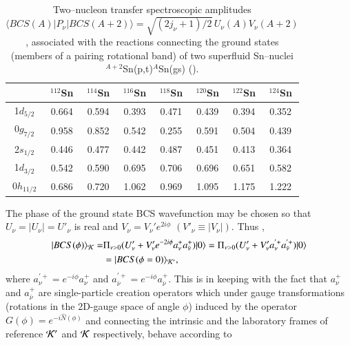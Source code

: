 \begin{table}[h!]
{\begin{tabular}{|c|c|c|c|c|c|c|c|}
\cline{1-8} 
& $^{112}$Sn & $^{114}$Sn&  $^{116}$Sn & $^{118}$Sn&  $^{120}$Sn &  $^{122}$Sn &  $^{124}$Sn          \\
\hline
1$d_{5/2}$            & 0.664      &  0.594   & 0.393    & 0.471      & 0.439     &  0.394    &  0.352                  \\
\hline 
0$g_{7/2}$            &  0.958     &  0.852  &  0.542     &  0.255   &  0.591      &  0.504  &   0.439                 \\
\hline 
2$s_{1/2}$            &  0.446    & 0.477    &  0.442    &  0.487     &  0.451   &  0.413     & 0.364                   \\
\hline 
1$d_{3/2}$            &  0.542    & 0.590   &  0.695    &  0.706     &  0.696   & 0.651   &   0.582                 \\
\hline 
0$h_{11/2}$            & 0.686     & 0.720    &  1.062     &  0.969     &  1.095   &  1.175    &   1.222                 \\
\hline 
\end{tabular}}
\caption{Two--nucleon transfer spectroscopic amplitudes $\langle BCS(A)|P_{\nu}|BCS(A+2)\rangle=\sqrt{(2j_{\nu}+1)/2}\,U_{\nu}(A)V_{\nu}(A+2)$, associated with the  reactions connecting the ground states (members of a pairing rotational band) of two superfluid Sn--nuclei $^{A+2}$Sn(p,t)$^A$Sn(gs) (\cite{Potel:13}).}\label{tab8_2_1}
\end{table}
The phase of the ground state BCS wavefunction may be chosen so that $U_{\nu} = |U_{\nu}| = U'_{\nu}$
is real and $V_{\nu} = V_{\nu}' e^{2 i \phi}$ $(V'_{\nu} \equiv |V_{\nu}|)$. Thus \citep{Schrieffer:73},
\begin{align}
\nonumber |BCS(\phi)\rangle_{\cal K}  =& \Pi_{\nu>0} (U'_{\nu} + V'_{\nu} e^{-2 i \phi} a^+_{\nu} a^+_{\bar \nu}) |0\rangle = 
\Pi_{\nu>0} (U'_{\nu} + V'_{\nu} a^{'+}_{\nu} a^{'+}_{\bar \nu}) |0\rangle  \\
&=|BCS(\phi =0)\rangle_{\cal K'},
\label{mean}
\end{align}
where $a^{'+}_{\nu} = e^{-i \phi}a^+_{\nu}$ and   $a^{'+}_{\bar \nu} = e^{-i \phi}a^+_{\bar \nu}$.
This is in keeping with the fact that $a^+_{\nu}$ and $a^+_{\bar \nu}$ are single-particle  creation 
operators which under gauge transformations (rotations
in the 2D-gauge space of angle $\phi$) induced by the operator $G(\phi) = e^{- i \hat N (\phi)}$ and connecting the intrinsic and the laboratory frames of reference ${\cal K'}$ and ${\cal K}$ respectively, behave according to 
